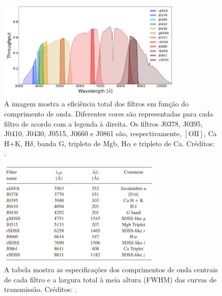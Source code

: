 \begin{figure}[h]
  \centering 
  \includegraphics[width=0.8\textwidth]{Imagens/dozefiltros.PNG} 
  \caption[Sistema de 12 filtros do S-PLUS.]{A imagem mostra a eficiência total dos filtros em função do comprimento de onda. Diferentes cores são representadas para cada filtro de acordo com a legenda à direita. Os filtros J0378, J0395, J0410, J0430, J0515, J0660 e J0861 são, respectivamente, $[\text{OII}]$, Ca H+K, H$\delta$, banda G, tripleto de Mgb, H$\alpha$ e tripleto de Ca. Créditos: .}
  \label{fig:dozefiltros} 
\end{figure}

\begin{figure}[h]
  \centering 
  \includegraphics[width=0.7\textwidth]{Imagens/filtros.PNG} 
  \caption[Sumário dos filtros do S-PLUS.]{A tabela mostra as especificações dos comprimentos de onda centrais de cada filtro e a largura total à meia altura (FWHM\footnotemark) das curvas de transmissão. Créditos: .}
  \label{fig:filtros} 
\end{figure}

